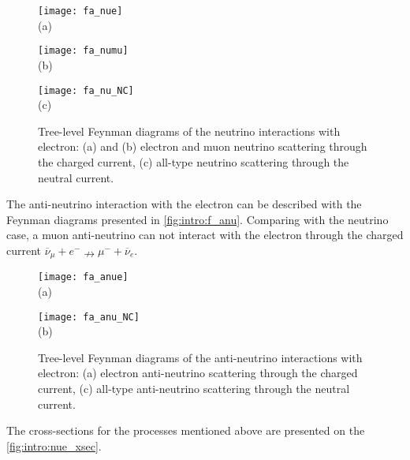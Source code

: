 \documentclass[../main.tex]{subfiles}
\begin{document}
\begin{figure}[!ht]
\centering
  \begin{minipage}[t]{0.29\linewidth}
    \centering
    \texttt{[image: fa\_nue]} \\ (a)
  \end{minipage}
  \begin{minipage}[t]{0.29\linewidth}
    \centering
    \texttt{[image: fa\_numu]} \\ (b)
  \end{minipage}
  \begin{minipage}[t]{0.29\linewidth}
    \centering
    \texttt{[image: fa\_nu\_NC]} \\ (c)
  \end{minipage}
  \caption{Tree-level Feynman diagrams of the neutrino interactions with electron: (a) and (b) electron and muon neutrino scattering through the charged current, (c) all-type neutrino scattering through the neutral current.}
  \label{fig:intro:f_nu}
\end{figure}

The anti-neutrino interaction with the electron can be described with the Feynman diagrams presented in \autoref{fig:intro:f_anu}. Comparing with the neutrino case, a muon anti-neutrino can not interact with the electron through the charged current $\overline{\nu}_\mu+ e^-\nrightarrow \mu^-+\overline{\nu}_e$.

\begin{figure}[!ht]
\centering
  \begin{minipage}[t]{0.29\linewidth}
    \centering
    \texttt{[image: fa\_anue]} \\ (a)
  \end{minipage}
  \begin{minipage}[t]{0.29\linewidth}
    \centering
    \texttt{[image: fa\_anu\_NC]} \\ (b)
    \end{minipage}
  \caption{Tree-level Feynman diagrams of the anti-neutrino interactions with electron: (a) electron anti-neutrino scattering through the charged current, (c) all-type anti-neutrino scattering through the neutral current.}
  \label{fig:intro:f_anu}
\end{figure}

The cross-sections for the processes mentioned above are presented on the \autoref{fig:intro:nue_xsec}.
\end{document}
